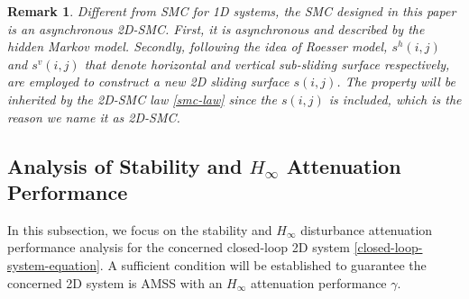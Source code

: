 \documentclass[journal,final,twocolumn]{IEEEtran}
\newtheorem{remark}{Remark}
\begin{document}
\begin{remark}
	Different from SMC for 1D systems, the SMC designed in this paper is an asynchronous 2D-SMC. First, it is asynchronous and described by the hidden Markov model. Secondly, following the idea of Roesser model, $s^{h}(i,j)$ and $s^{v}(i,j)$ that denote horizontal and vertical sub-sliding surface respectively, are employed to construct a new 2D sliding surface $s(i,j)$. The property will be inherited by the 2D-SMC law \eqref{smc-law} since the $s(i,j)$ is included, which is the reason we name it as 2D-SMC.
\end{remark}


	
\subsection{Analysis of Stability and $H_{\infty}$ Attenuation Performance } \label{stability&H_infty}
 In this subsection, we focus on the stability and $H_{\infty}$ disturbance attenuation performance analysis for the concerned closed-loop 2D system \eqref{closed-loop-system-equation}. A sufficient condition will be established to guarantee the concerned 2D system is  AMSS with an $H_{\infty}$ attenuation performance $\gamma$.
\end{document}
